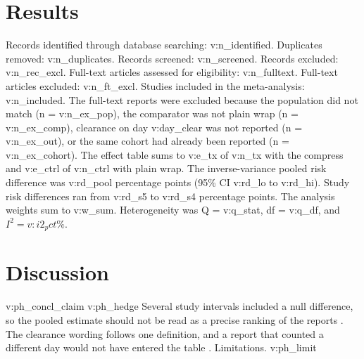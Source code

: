 \documentclass[11pt]{article}
\begin{document}
\section{Results}
Records identified through database searching: {{v:n_identified}}.
Duplicates removed: {{v:n_duplicates}}.
Records screened: {{v:n_screened}}.
Records excluded: {{v:n_rec_excl}}.
Full-text articles assessed for eligibility: {{v:n_fulltext}}.
Full-text articles excluded: {{v:n_ft_excl}}.
Studies included in the meta-analysis: {{v:n_included}}.
The full-text reports were excluded because the population did not match (n = {{v:n_ex_pop}}), the comparator was not plain wrap (n = {{v:n_ex_comp}}), clearance on day {{v:day_clear}} was not reported (n = {{v:n_ex_out}}), or the same cohort had already been reported (n = {{v:n_ex_cohort}}).
The effect table sums to {{v:e_tx}} of {{v:n_tx}} with the compress and {{v:e_ctrl}} of {{v:n_ctrl}} with plain wrap.
The inverse-variance pooled risk difference was {{v:rd_pool}} percentage points (95\% CI {{v:rd_lo}} to {{v:rd_hi}}).
Study risk differences ran from {{v:rd_s5}} to {{v:rd_s4}} percentage points.
The analysis weights sum to {{v:w_sum}}.
Heterogeneity was Q = {{v:q_stat}}, df = {{v:q_df}}, and $I^{2} = {{v:i2_pct}}\%$.
\section{Discussion}
{{v:ph_concl_claim}}
{{v:ph_hedge}}
Several study intervals included a null difference, so the pooled estimate should not be read as a precise ranking of the reports \cite{brindle2015}.
The clearance wording follows one definition, and a report that counted a different day would not have entered the table \cite{quill2021}.
Limitations.
{{v:ph_limit}}
\falsifybibliography
\end{document}
